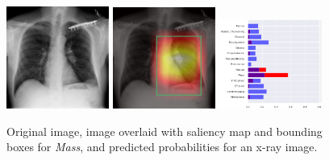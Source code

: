 \documentclass[8pt]{beamer}
\begin{document}
\begin{frame}
\begin{figure}[H]
  \centering
  \includegraphics[width=0.3\textwidth]{images/preds/mass}\hspace{0.01\textwidth}%
  \includegraphics[width=0.3\textwidth]{images/preds/mass_cam}\hspace{0.01\textwidth}%
  \includegraphics[width=0.3\textwidth]{images/preds/mass_probs}\\[0.01\textwidth]
  \caption{Original image, image overlaid with saliency map and bounding boxes
    for \emph{Mass}, and predicted probabilities for an x-ray image.}
  \label{examples_5}
\end{figure}
\end{frame}
\end{document}
